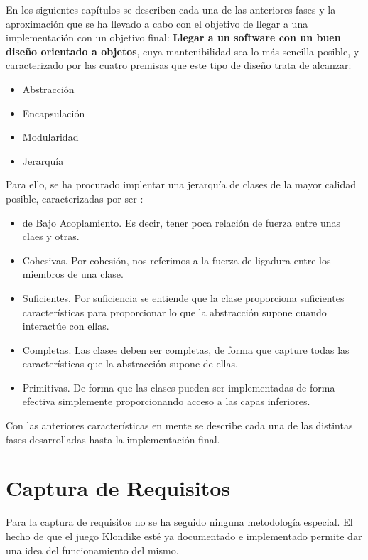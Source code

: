 \documentclass[11pt]{article}
\begin{document}
En los siguientes capítulos se describen cada una de las anteriores fases y la aproximación que se ha llevado a cabo con el objetivo de llegar a una implementación con un objetivo final: \textbf{Llegar a un software con un buen diseño orientado a objetos}, cuya mantenibilidad sea lo más sencilla posible, y caracterizado por las cuatro premisas que este tipo de diseño trata de alcanzar:

\begin{itemize}\itemsep0pt
\item{Abstracción}
\item{Encapsulación}
\item{Modularidad}
\item{Jerarquía}
\end{itemize}

Para ello, se ha procurado implentar una jerarquía de clases de la mayor calidad posible, caracterizadas por ser :
\begin{itemize}\itemsep0pt
\item{de Bajo Acoplamiento}. Es decir, tener poca relación de fuerza entre unas claes y otras.
\item{Cohesivas}. Por cohesión, nos referimos a la fuerza de ligadura entre los miembros de una clase.
\item{Suficientes}. Por suficiencia se entiende que la clase proporciona suficientes características para proporcionar lo que la abstracción supone cuando interactúe con ellas.
\item{Completas}. Las clases deben ser completas, de forma que capture todas las características que la abstracción supone de ellas.
\item{Primitivas}. De forma que las clases pueden ser implementadas de forma efectiva simplemente proporcionando acceso a las capas inferiores.
\end{itemize}

Con las anteriores características en mente se describe cada una de las distintas fases desarrolladas hasta la implementación final.

\pagebreak

\section{Captura de Requisitos}

Para la captura de requisitos no se ha seguido ninguna metodología especial. El hecho de que el juego Klondike esté ya documentado e implementado permite dar una idea del funcionamiento del mismo.
\end{document}
